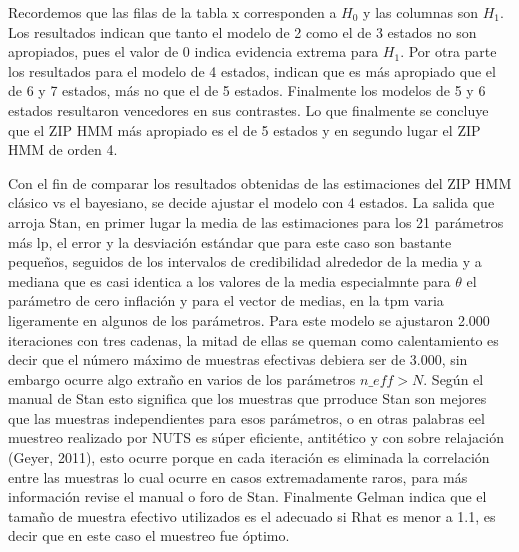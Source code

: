 \documentclass[a4paper]{article}\usepackage[]{graphicx}\usepackage[]{color}
\begin{document}
Recordemos que las filas de la tabla x corresponden a $H_0$ y las columnas son $H_1$. Los resultados indican que tanto el modelo de 2 como el de 3 estados no son apropiados, pues el valor de 0 indica evidencia extrema para $H_1$. Por otra parte los resultados para el modelo de 4 estados, indican que es más apropiado que el de 6 y 7 estados, más no que el de 5 estados. Finalmente los modelos de 5 y 6 estados resultaron vencedores en sus contrastes. Lo que finalmente se concluye que el ZIP HMM más apropiado es el de 5 estados y en segundo lugar el ZIP HMM de orden 4.



Con el fin de comparar los resultados obtenidas de las estimaciones del ZIP HMM clásico vs el bayesiano, se decide ajustar el modelo con 4 estados. La salida que arroja Stan, en primer lugar la media de las estimaciones para los 21 parámetros más lp, el error y la desviación estándar que para este caso son bastante pequeños, seguidos de los intervalos de credibilidad alrededor de la media y a mediana que es casi identica a los valores de la media especialmnte para $\theta$ el parámetro de cero inflación y para el vector de medias, en la tpm varia ligeramente en algunos de los parámetros. Para este modelo se ajustaron 2.000 iteraciones con tres cadenas, la mitad de ellas se queman como calentamiento es decir que el número máximo de muestras efectivas debiera ser de 3.000, sin embargo ocurre algo extraño en varios de los parámetros $n\_eff > N$. Según el manual de Stan esto significa que los muestras que prroduce Stan son mejores que las muestras independientes para esos parámetros, o en otras palabras eel muestreo realizado por NUTS es súper eficiente, antitético y con sobre relajación (Geyer, 2011), esto ocurre porque en cada iteración es eliminada la correlación entre las muestras lo cual ocurre en casos extremadamente raros, para más información revise el manual o foro de Stan. Finalmente Gelman indica que el tamaño de muestra efectivo utilizados es el adecuado si Rhat es menor a 1.1, es decir que en este caso el muestreo fue óptimo.
\end{document}
